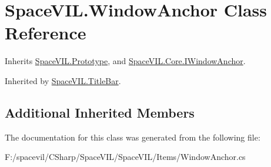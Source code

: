 \hypertarget{class_space_v_i_l_1_1_window_anchor}{}\section{Space\+V\+I\+L.\+Window\+Anchor Class Reference}
\label{class_space_v_i_l_1_1_window_anchor}


Inherits \mbox{\hyperlink{class_space_v_i_l_1_1_prototype}{Space\+V\+I\+L.\+Prototype}}, and \mbox{\hyperlink{interface_space_v_i_l_1_1_core_1_1_i_window_anchor}{Space\+V\+I\+L.\+Core.\+I\+Window\+Anchor}}.



Inherited by \mbox{\hyperlink{class_space_v_i_l_1_1_title_bar}{Space\+V\+I\+L.\+Title\+Bar}}.

\subsection*{Additional Inherited Members}


The documentation for this class was generated from the following file\+:\begin{DoxyCompactItemize}
\item 
F\+:/spacevil/\+C\+Sharp/\+Space\+V\+I\+L/\+Space\+V\+I\+L/\+Items/Window\+Anchor.\+cs\end{DoxyCompactItemize}
